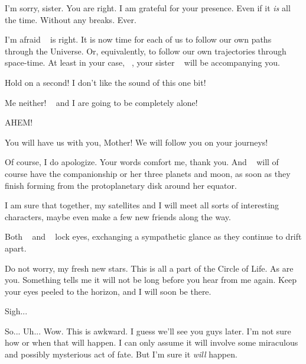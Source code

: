 \documentclass[main.tex]{subfiles}
\begin{document}
\par \Alcyone I'm sorry, sister.  You are right.  I am grateful for your presence.  Even if it \textit{is} all the time.  Without any breaks.  Ever.

\par \Maia I'm afraid \rmalcyone~ is right.  It is now time for each of us to follow our own paths through the Universe.  Or, equivalently, to follow our own trajectories through space-time.  At least in your case, \rmtaygete~, your sister \rmalcyone~ will be accompanying you.

\par \Electra Hold on a second!  I don't like the sound of this one bit!

\par \Sterope Me neither! \rmelectra~ and I are going to be completely alone!

\par \Alphab AHEM!

\par \Betab You will have us with you, Mother!  We will follow you on your journeys!

\par \Sterope Of course, I do apologize.  Your words comfort me, thank you.  And \rmelectra~ will of course have the companionship or her three planets and moon, as soon as they finish forming from the protoplanetary disk around her equator.

\par \Electra I am sure that together, my satellites and I will meet all sorts of interesting characters, maybe even make a few new friends along the way.  

\par \nar Both \rmsterope~ and \rmelectra~ lock eyes, exchanging a sympathetic glance as they continue to drift apart.  

\par \Maia Do not worry, my fresh new stars. This is all a part of the Circle of Life.  As are you.  Something tells me it will not be long before you hear from me again. Keep your eyes peeled to the horizon, and I will soon be there.  

\par \Electra Sigh...  

\par \Taygete So... Uh... Wow.  This is awkward.  I guess we'll see you guys later.  I'm not sure how or when that will happen.  I can only assume it will involve some miraculous and possibly mysterious act of fate.  But I'm sure it \textit{will} happen.
  
\end{document}
